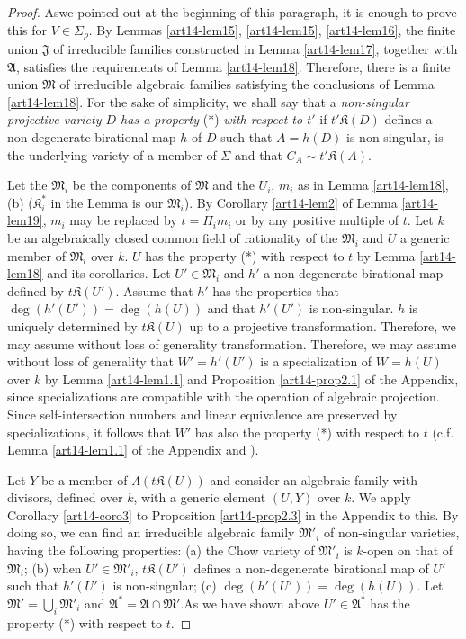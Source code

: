 \begin{proof}
As\pageoriginale we pointed out at the beginning of this paragraph, it is enough to prove this for $V\in \Sigma_{\rho}$. By Lemmas \ref{art14-lem15}, \ref{art14-lem15}, \ref{art14-lem16}, the finite union $\mathfrak{J}$ of irreducible families constructed in Lemma \ref{art14-lem17}, together with $\mathfrak{A}$, satisfies the requirements of Lemma \ref{art14-lem18}. Therefore, there is a finite union $\mathfrak{M}$ of irreducible algebraic families satisfying the conclusions of Lemma \ref{art14-lem18}. For the sake of simplicity, we shall say that a {\em non-singular projective variety $D$ has a property} (*) {\em with respect to $t'$} if $t'\mathfrak{K}(D)$ defines a non-degenerate birational map $h$ of $D$ such that $A=h(D)$ is non-singular, is the underlying variety of a member of $\Sigma$ and that $C_{A}\sim t'\mathfrak{K}(A)$.

Let the $\mathfrak{M}_{i}$ be the components of $\mathfrak{M}$ and the $U_{i}$, $m_{i}$ as in Lemma \ref{art14-lem18}, (b) ($\mathfrak{K}^{*}_{i}$ in the Lemma is our $\mathfrak{M}_{i}$). By Corollary \ref{art14-lem2} of Lemma \ref{art14-lem19}, $m_{i}$ may be replaced by $t=\Pi_{i}m_{i}$ or by any positive multiple of $t$. Let $k$ be an algebraically closed common field of rationality of the $\mathfrak{M}_{i}$ and $U$ a generic member of $\mathfrak{M}_{i}$ over $k$. $U$ has the property (*) with respect to $t$ by Lemma \ref{art14-lem18} and its corollaries. Let $U'\in \mathfrak{M}_{i}$ and $h'$ a non-degenerate birational map defined by $t\mathfrak{K}(U')$. Assume that $h'$ has the properties that $\deg(h'(U'))=\deg (h(U))$ and that $h'(U')$ is non-singular. $h$ is uniquely determined by $t\mathfrak{K}(U)$ up to a projective transformation. Therefore, we may assume without loss of generality transformation. Therefore, we may assume without loss of generality that $W'=h'(U')$ is a specialization of $W=h(U)$ over $k$ by Lemma \ref{art14-lem1.1} and Proposition \ref{art14-prop2.1} of the Appendix, since specializations are compatible with the operation of algebraic projection. Since self-intersection numbers and linear equivalence are preserved by specializations, it follows that $W'$ has also the property (*) with respect to $t$ (c.f. Lemma \ref{art14-lem1.1} of the Appendix and \cite{art14-key2}).

Let $Y$ be a member of $\Lambda(t\mathfrak{K}(U))$ and consider an algebraic family with divisors, defined over $k$, with a generic element $(U,Y)$ over $k$. We apply Corollary \ref{art14-coro3} to Proposition \ref{art14-prop2.3} in the Appendix to this. By doing so, we can find an irreducible algebraic family $\mathfrak{M}'_{i}$ of non-singular varieties, having the following properties: (a) the Chow variety of $\mathfrak{M}'_{i}$ is $k$-open on that of $\mathfrak{M}_{i}$; (b) when $U'\in \mathfrak{M}'_{i}$, $t\mathfrak{K}(U')$ defines a non-degenerate birational map of $U'$ such that $h'(U')$ is non-singular; (c) $\deg(h'(U'))=\deg (h(U))$. Let $\mathfrak{M}'=\bigcup_{i}\mathfrak{M}'_{i}$ and $\mathfrak{A}^{*}=\mathfrak{A}\cap \mathfrak{M}'$.\pageoriginale As we have shown above $U'\in \mathfrak{A}^{*}$ has the property (*) with respect to $t$.


\end{proof}

